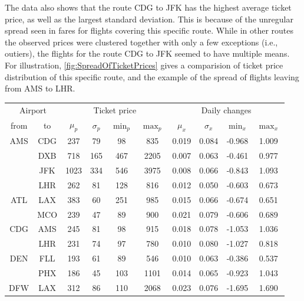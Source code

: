 The data also shows that the route CDG to JFK has the highest average ticket price, as well as the largest standard deviation. This is because of the unregular spread seen in fares for flights covering this specific route. While in other routes the observed prices were clustered together with only a few exceptions (i.e., outiers), the flights for the route CDG to JFK seemed to have multiple means. For illustration, \autoref{fig:SpreadOfTicketPrices} gives a comparision of ticket price distribution of this specific route, and the example of the spread of flights leaving from AMS to LHR.


\begin{table}
\centering
\footnotesize
\begin{tabular}{c c | c c c c | c c c c}
\toprule
\multicolumn{2}{c|}{Airport}  & \multicolumn{4}{c|}{Ticket price} & \multicolumn{4}{c}{Daily changes} \\[.4ex]
from & to    &  $\mu_{p}$ & $\sigma_{p}$  &  $\min_p$  & $\max_p$  & $\mu_x$ & $\sigma_x$  & $\min_x$  &  $\max_x$ \\ 
\midrule
AMS  &  CDG  &   237  &    79  &    98  &   835  &  0.019  &  0.084  &  -0.968  &  1.009  \\
~    &  DXB  &   718  &   165  &   467  &  2205  &  0.007  &  0.063  &  -0.461  &  0.977  \\
~    &  JFK  &  1023  &   334  &   546  &  3975  &  0.008  &  0.066  &  -0.843  &  1.093  \\
~    &  LHR  &   262  &    81  &   128  &   816  &  0.012  &  0.050  &  -0.603  &  0.673  \\[.5ex]
ATL  &  LAX  &   383  &    60  &   251  &   985  &  0.015  &  0.066  &  -0.674  &  0.651  \\
~    &  MCO  &   239  &    47  &    89  &   900  &  0.021  &  0.079  &  -0.606  &  0.689  \\[.5ex]
CDG  &  AMS  &   245  &    81  &    98  &   915  &  0.018  &  0.078  &  -1.053  &  1.036  \\
~    &  LHR  &   231  &    74  &    97  &   780  &  0.010  &  0.080  &  -1.027  &  0.818  \\[.5ex]
DEN  &  FLL  &   193  &    61  &    89  &   546  &  0.010  &  0.063  &  -0.386  &  0.537  \\
~    &  PHX  &   186  &    45  &   103  &  1101  &  0.014  &  0.065  &  -0.923  &  1.043  \\[.5ex]
DFW  &  LAX  &   312  &    86  &   110  &  2068  &  0.023  &  0.076  &  -1.695  &  1.690  \\

\end{tabular}
\end{table}
